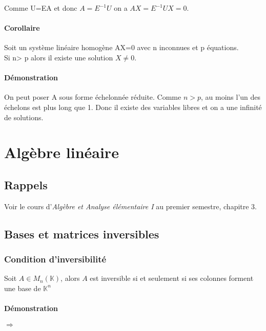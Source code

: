 \documentclass[a4paper,10pt]{book} %
\newcommand{\K}{\mathbb{K}}
\begin{document}
Comme U=EA et donc $A=E^{-1}U$ on a $AX=E^{-1}UX=0$.

\subsubsection{Corollaire}
Soit un système linéaire homogène AX=0 avec n inconnues et p équations.\\
Si n> p alors il existe une solution $X\neq 0$.

\subsubsection{Démonstration}
On peut poser A sous forme échelonnée réduite. Comme $n>p$, au moins l'un des échelons est plus long que 1.
Donc il existe des variables libres et on a une infinité de solutions.







\chapter{Algèbre linéaire}
\section{Rappels}
Voir le cours d'\textit{Algèbre et Analyse élémentaire I} au premier semestre, chapitre 3.

\section{Bases et matrices inversibles}
\subsection{Condition d'inversibilité}
Soit $A\in M_n(\K)$, alors $A$ est inversible si et seulement si ses colonnes forment une base de $\K^n$

\subsubsection{Démonstration}
$\Rightarrow$
\end{document}
